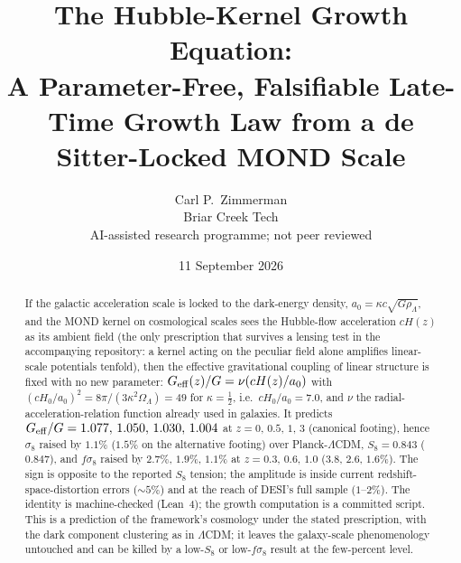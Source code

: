 \documentclass[11pt,letterpaper]{article}
\title{The Hubble-Kernel Growth Equation:\\ A Parameter-Free, Falsifiable Late-Time Growth Law from a de Sitter-Locked MOND Scale}
\author{Carl P.\ Zimmerman\\ \small Briar Creek Tech\\ \small AI-assisted research programme; not peer reviewed}
\date{11 September 2026}
\begin{document}
\maketitle
\begin{abstract}
If the galactic acceleration scale is locked to the dark-energy density, $a_0=\kappa c\sqrt{G\rho_\Lambda}$, and the MOND kernel on cosmological scales sees the Hubble-flow acceleration $cH(z)$ as its ambient field (the only prescription that survives a lensing test in the accompanying repository: a kernel acting on the peculiar field alone amplifies linear-scale potentials tenfold), then the effective gravitational coupling of linear structure is fixed with no new parameter: $G_{\rm eff}(z)/G=\nu\!\left(cH(z)/a_0\right)$ with $(cH_0/a_0)^2=8\pi/(3\kappa^2\Omega_\Lambda)=49$ for $\kappa=\tfrac12$, i.e.\ $cH_0/a_0=7.0$, and $\nu$ the radial-acceleration-relation function already used in galaxies. It predicts $G_{\rm eff}/G=1.077,\,1.050,\,1.030,\,1.004$ at $z=0,\,0.5,\,1,\,3$ (canonical footing), hence $\sigma_8$ raised by $1.1\%$ ($1.5\%$ on the alternative footing) over Planck-$\Lambda$CDM, $S_8=0.843$ ($0.847$), and $f\sigma_8$ raised by $2.7\%$, $1.9\%$, $1.1\%$ at $z=0.3,\,0.6,\,1.0$ ($3.8$, $2.6$, $1.6\%$). The sign is opposite to the reported $S_8$ tension; the amplitude is inside current redshift-space-distortion errors ($\sim5\%$) and at the reach of DESI's full sample ($1$--$2\%$). The identity is machine-checked (Lean~4); the growth computation is a committed script. This is a prediction of the framework's cosmology under the stated prescription, with the dark component clustering as in $\Lambda$CDM; it leaves the galaxy-scale phenomenology untouched and can be killed by a low-$S_8$ or low-$f\sigma_8$ result at the few-percent level.
\end{abstract}
\end{document}
